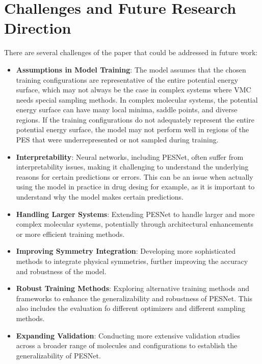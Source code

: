 \documentclass{article}
\begin{document}
\section{Challenges and Future Research Direction}
There are several challenges of the paper that could be addressed in future work:
\begin{itemize}
    \item \textbf{Assumptions in Model Training}: The model assumes that the chosen training configurations are representative of the entire potential energy surface, which may not always be the case in complex systems where VMC needs special sampling methods. In complex molecular systems, the potential energy surface can have many local minima, saddle points, and diverse regions.  If the training configurations do not adequately represent the entire potential energy surface, the model may not perform well in regions of the PES that were underrepresented or not sampled during training.
    \item \textbf{Interpretability}: Neural networks, including PESNet, often suffer from interpretability issues, making it challenging to understand the underlying reasons for certain predictions or errors. This can be an issue when actually using the model in practice in drug desing for example, as it is important to understand why the model makes certain predictions.
    \item \textbf{Handling Larger Systems}: Extending PESNet to handle larger and more complex molecular systems, potentially through architectural enhancements or more efficient training methods.
    \item \textbf{Improving Symmetry Integration}: Developing more sophisticated methods to integrate physical symmetries, further improving the accuracy and robustness of the model.
    \item \textbf{Robust Training Methods}: Exploring alternative training methods and frameworks to enhance the generalizability and robustness of PESNet. This also includes the evaluation fo different optimizers and different sampling methods.
    \item \textbf{Expanding Validation}: Conducting more extensive validation studies across a broader range of molecules and configurations to establish the generalizability of PESNet.
\end{itemize}
\end{document}
